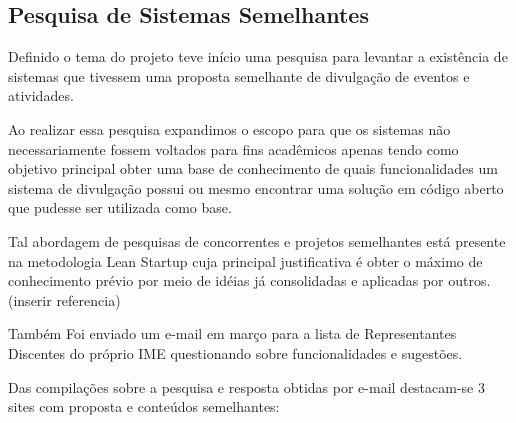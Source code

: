 \subsection{Pesquisa de Sistemas Semelhantes}
\par Definido o tema do projeto teve início uma pesquisa para levantar a existência de sistemas que tivessem uma proposta semelhante de divulgação de eventos e atividades.
\par Ao realizar essa pesquisa expandimos o escopo para que os sistemas não necessariamente fossem voltados para fins acadêmicos apenas tendo como objetivo principal obter uma base de conhecimento de quais funcionalidades um sistema de divulgação possui ou mesmo encontrar uma solução em código aberto que pudesse ser utilizada como base.
\par Tal abordagem de pesquisas de concorrentes e projetos semelhantes está presente na metodologia Lean Startup cuja principal justificativa é obter o máximo de conhecimento prévio por meio de idéias já consolidadas e aplicadas por outros. (inserir referencia)
 \par Também Foi enviado um e-mail em março para a lista de Representantes Discentes do próprio IME questionando sobre funcionalidades e sugestões.
\par Das compilações sobre a pesquisa e resposta obtidas por e-mail destacam-se 3 sites com proposta e conteúdos semelhantes:
